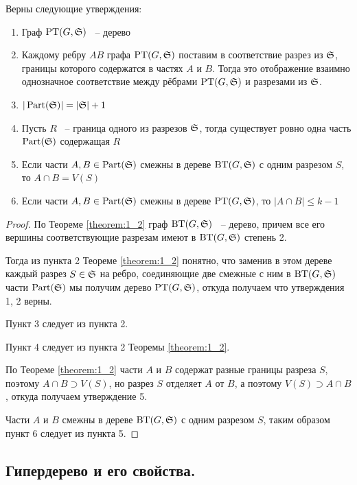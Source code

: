 \begin{customcrly}{1.1} \label{crly:1_1}
	Верны следующие утверждения:

	\begin{enumerate}
		\item Граф $\PT(G, \S)$ ~-- дерево 
		\item Каждому ребру $AB$ графа $\PT(G, \S)$ поставим в соответствие разрез из $\S$, границы которого содержатся в частях $A$ и $B$.
			Тогда это отображение взаимно однозначное соответствие между рёбрами $\PT(G, \S)$ и разрезами из $\S$.
		\item $|\Part(\S)| = |\S| + 1$
		\item Пусть  $R$ ~-- граница одного из разрезов $\S$, тогда существует ровно одна часть $\Part(\S)$ содержащая $R$
		\item Если части  $A, B \in \Part(\S)$ смежны в дереве $\BT(G, \S)$ с одним разрезом $S$, то $A \cap B = V(S)$
		\item Если части  $A, B \in \Part(\S)$ смежны в дереве $\PT(G, \S)$, то $|A \cap B| \leqslant k - 1$
	\end{enumerate}
 
\end{customcrly}

\begin{proof}
	По Теореме \ref{theorem:1_2} граф $\BT(G, \S)$ ~-- дерево, причем все его вершины соответствующие разрезам имеют в $\BT(G, \S)$ степень 2.

	Тогда из пункта 2 Теореме \ref{theorem:1_2} понятно, что заменив в этом дереве каждый разрез $S \in \S$ на ребро, соединяющие две смежные с ним в $\BT(G, \S)$ части $\Part(\S)$ мы получим дерево $\PT(G, \S)$, откуда получаем что утверждения 1, 2 верны.

	Пункт 3 следует из пункта 2.

	Пункт 4 следует из пункта 2 Теоремы \ref{theorem:1_2}.

	По Теореме \ref{theorem:1_2} части $A$ и $B$ содержат разные границы разреза $S$, поэтому $A \cap B \supset V(S)$, но разрез  $S$ отделяет $A$ от $B$, а поэтому $V(S) \supset A \cap B $, откуда получаем утверждение 5.

	Части $A$ и $B$ смежны в дереве $\BT(G, \S)$ с одним разрезом $S$, таким образом пункт 6 следует из пункта 5.
\end{proof}

\subsection{Гипердерево и его свойства.}

